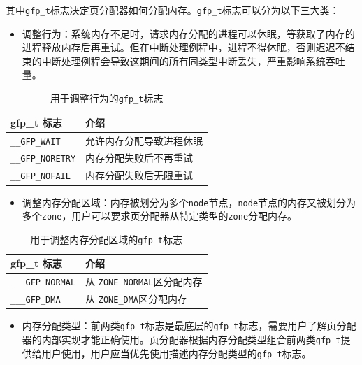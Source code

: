 \documentclass[AutoFakeBold]{LZUThesis}
\newcommand{\tightlist}{%
  \setlength{\itemsep}{0pt}\setlength{\parskip}{0pt}}
\begin{document}
\begin{sloppypar}
其中\texttt{gfp\_t}标志决定页分配器如何分配内存。\texttt{gfp\_t}标志可以分为以下三大类：

\begin{itemize}
\tightlist
\item
  调整行为：系统内存不足时，请求内存分配的进程可以休眠，等获取了内存的进程释放内存后再重试。但在中断处理例程中，进程不得休眠，否则迟迟不结束的中断处理例程会导致这期间的所有同类型中断丢失，严重影响系统吞吐量。
\end{itemize}

\begin{longtable}[]{@{}ll@{}}
\caption{用于调整行为的\texttt{gfp\_t}标志}\label{table:gfp-action-modifier} \\
\toprule\noalign{}
gfp\_t 标志 & 介绍 \\
\midrule\noalign{}
\endhead
\bottomrule\noalign{}
\endlastfoot
\texttt{\_\_GFP\_WAIT} & 允许内存分配导致进程休眠 \\
\texttt{\_\_GFP\_NORETRY} & 内存分配失败后不再重试 \\
\texttt{\_\_GFP\_NOFAIL} & 内存分配失败后无限重试 \\
\end{longtable}

\begin{itemize}
\tightlist
\item
  调整内存分配区域：内存被划分为多个\texttt{node}节点，\texttt{node}节点的内存又被划分为多个\texttt{zone}，用户可以要求页分配器从特定类型的\texttt{zone}分配内存。
\end{itemize}

\begin{longtable}[]{@{}ll@{}}
\caption{用于调整内存分配区域的\texttt{gfp\_t}标志}\label{table:gfp-zone-modifier} \\
\toprule\noalign{}
gfp\_t 标志 & 介绍 \\
\midrule\noalign{}
\endhead
\bottomrule\noalign{}
\endlastfoot
\texttt{\_\_\_GFP\_NORMAL} & 从 \texttt{ZONE\_NORMAL}区分配内存 \\
\texttt{\_\_\_GFP\_DMA} & 从 \texttt{ZONE\_DMA}区分配内存 \\
\end{longtable}

\begin{itemize}
\tightlist
\item
  内存分配类型：前两类\texttt{gfp\_t}标志是最底层的\texttt{gfp\_t}标志，需要用户了解页分配器的内部实现才能正确使用。页分配器根据内存分配类型组合前两类\texttt{gfp\_t}提供给用户使用，用户应当优先使用描述内存分配类型的\texttt{gfp\_t}标志。
\end{itemize}


\end{sloppypar}
\end{document}
